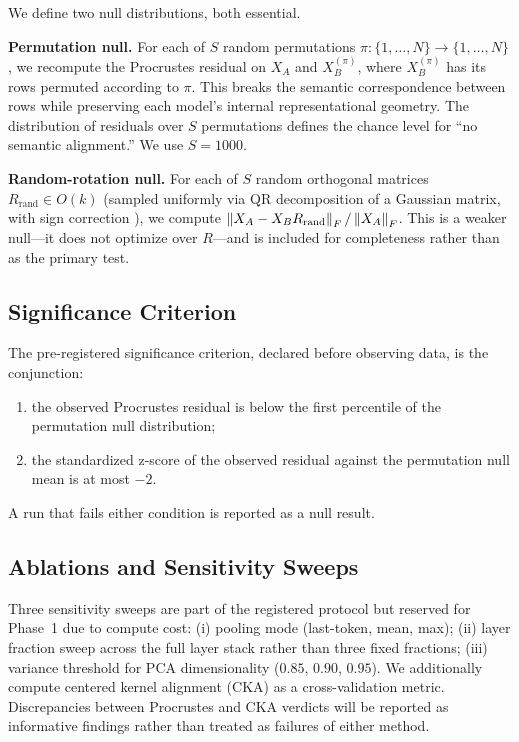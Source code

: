 We define two null distributions, both essential.

\textbf{Permutation null.} For each of $S$ random permutations
$\pi: \{1, \ldots, N\} \to \{1, \ldots, N\}$, we recompute the Procrustes
residual on $X_A$ and $X_B^{(\pi)}$, where $X_B^{(\pi)}$ has its rows
permuted according to $\pi$. This breaks the semantic correspondence
between rows while preserving each model's internal representational
geometry. The distribution of residuals over $S$ permutations defines
the chance level for ``no semantic alignment.'' We use $S = 1000$.

\textbf{Random-rotation null.} For each of $S$ random orthogonal matrices
$R_{\text{rand}} \in O(k)$ (sampled uniformly via QR decomposition of a
Gaussian matrix, with sign correction \cite{mezzadri2007generate}), we
compute $\left\lVert X_A - X_B R_{\text{rand}}\right\rVert_F / \left\lVert X_A\right\rVert_F$. This is a
weaker null---it does not optimize over $R$---and is included for
completeness rather than as the primary test.

\subsection{Significance Criterion}

The pre-registered significance criterion, declared before observing
data, is the conjunction:
\begin{enumerate}
    \item the observed Procrustes residual is below the first percentile
        of the permutation null distribution;
    \item the standardized z-score of the observed residual against the
        permutation null mean is at most $-2$.
\end{enumerate}
A run that fails either condition is reported as a null result.

\subsection{Ablations and Sensitivity Sweeps}

Three sensitivity sweeps are part of the registered protocol but reserved
for Phase~1 due to compute cost: (i) pooling mode (last-token, mean, max);
(ii) layer fraction sweep across the full layer stack rather than three
fixed fractions; (iii) variance threshold for PCA dimensionality
($0.85$, $0.90$, $0.95$). We additionally compute centered kernel alignment
(CKA) \cite{kornblith2019similarity} as a cross-validation metric.
Discrepancies between Procrustes and CKA verdicts will be reported as
informative findings rather than treated as failures of either method.

